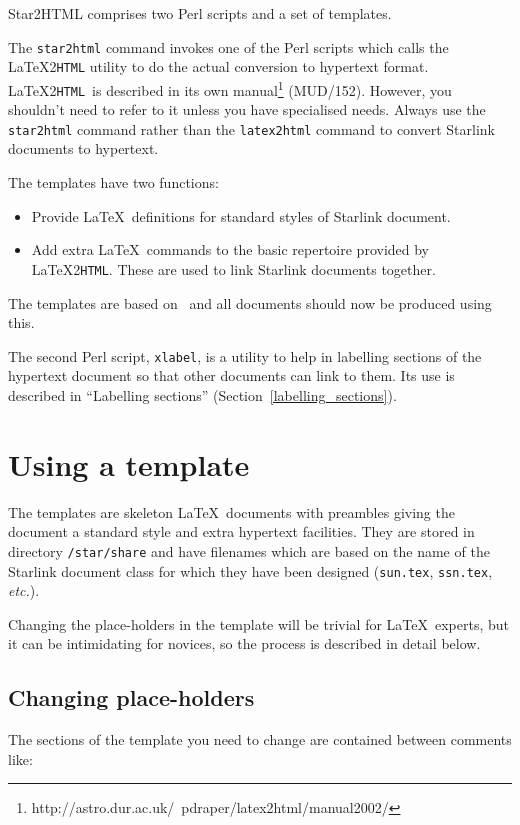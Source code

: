 \documentclass[twoside,11pt]{article}
\newcommand{\htmladdnormallinkfoot}[2]{#1\footnote{#2}}
\newcommand{\htmladdnormallink}[2]{#1}
\newcommand{\htmlref}[2]{#1}
\newcommand{\latex}[1]{#1}
\newcommand{\xlabel}[1]{}
\newcommand{\latextohtml}{\LaTeX2\texttt{HTML}}
\renewcommand{\_}{\texttt{\symbol{95}}}
\newcommand{\LtoHURL}{http://www.tex.ac.uk/tex-archive/support/latex2html/}
\newcommand{\LtoHManURL}{http://astro.dur.ac.uk/~{}pdraper/latex2html/manual2002/}
\begin{document}
Star2HTML comprises two Perl scripts and a set of templates.

The
\htmlref{\texttt{star2html}}{star2html}
command invokes one of the Perl scripts which calls the
\htmladdnormallink{\latextohtml}{\LtoHURL}
utility to do the actual conversion to hypertext format.
\latextohtml\ is described in its own
\htmladdnormallinkfoot{manual}{\LtoHManURL}\latex{ (MUD/152)}.
However, you shouldn't need to refer to it unless you have specialised needs.
Always use the \texttt{star2html} command rather than the
\texttt{latex2html} command to convert Starlink documents to hypertext.

The templates have two functions:
\begin{itemize}
\item Provide \LaTeX\ definitions for standard styles of Starlink document.
\item Add extra \LaTeX\ commands to the basic repertoire provided by
\latextohtml.
These are used to link Starlink documents together.
\end{itemize}

The templates are based on \LaTeXe\, and all documents should now be
produced using this.

The second Perl script,
\htmlref{\texttt{xlabel}}{xlabel},
is a utility to help in labelling sections of the hypertext document so that
other documents can link to them.
Its use is described in
\htmlref{``Labelling sections''}{labelling_sections}
\latex{ (Section~\ref{labelling_sections})}.

\section{\xlabel{using_a_template}\label{using_a_template}Using a template}

The templates are skeleton \LaTeX\ documents with preambles giving
the document a standard style and extra hypertext facilities.
They are stored in directory \texttt{/star/share} and have filenames
which are based on the name of the Starlink document class for which they
have been designed (\texttt{sun.tex}, \texttt{ssn.tex}, \textit{etc.}).

Changing the place-holders in the template will be trivial for \LaTeX\
experts, but it can be intimidating for novices, so the process is
described in detail below.

\subsection{\xlabel{changing_placeholders}Changing place-holders}
The sections of the template you need to change are contained between comments
like:
\end{document}
